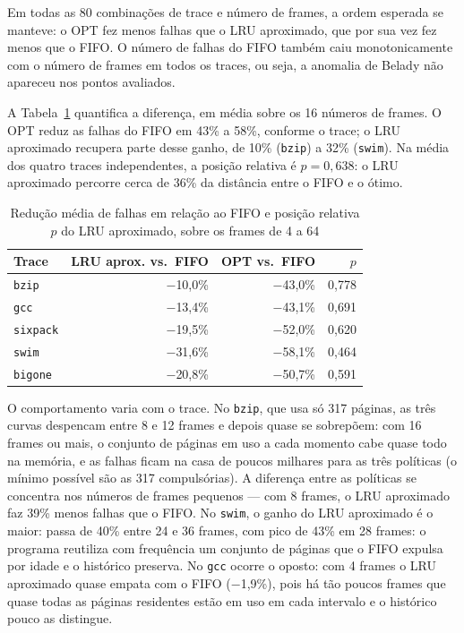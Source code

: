 \documentclass[12pt]{article}
\begin{document}
Em todas as 80 combinações de trace e número de frames, a ordem esperada se
manteve: o OPT fez menos falhas que o LRU aproximado, que por sua vez fez menos
que o FIFO. O número de falhas do FIFO também caiu monotonicamente com o número
de frames em todos os traces, ou seja, a anomalia de Belady não apareceu nos
pontos avaliados.

A Tabela~\ref{tab:resumo} quantifica a diferença, em média sobre os 16 números
de frames. O OPT reduz as falhas do FIFO em 43\% a 58\%, conforme o trace; o
LRU aproximado recupera parte desse ganho, de 10\% (\texttt{bzip}) a 32\%
(\texttt{swim}). Na média dos quatro traces independentes, a posição relativa
é $p = 0{,}638$: o LRU aproximado percorre cerca de 36\% da distância entre o
FIFO e o ótimo.

\begin{table}[ht]
\centering
\caption{Redução média de falhas em relação ao FIFO e posição relativa $p$ do
  LRU aproximado, sobre os frames de 4 a 64}
\label{tab:resumo}
\begin{tabular}{lrrr}
\hline
Trace & LRU aprox. vs.\ FIFO & OPT vs.\ FIFO & $p$ \\
\hline
\texttt{bzip}    & $-$10,0\% & $-$43,0\% & 0,778 \\
\texttt{gcc}     & $-$13,4\% & $-$43,1\% & 0,691 \\
\texttt{sixpack} & $-$19,5\% & $-$52,0\% & 0,620 \\
\texttt{swim}    & $-$31,6\% & $-$58,1\% & 0,464 \\
\texttt{bigone}  & $-$20,8\% & $-$50,7\% & 0,591 \\
\hline
\end{tabular}
\end{table}

O comportamento varia com o trace. No \texttt{bzip}, que usa só 317 páginas, as
três curvas despencam entre 8 e 12 frames e depois quase se sobrepõem: com 16
frames ou mais, o conjunto de páginas em uso a cada momento cabe quase todo na
memória, e as falhas ficam na casa de poucos milhares para as três políticas
(o mínimo possível são as 317 compulsórias). A diferença entre as políticas se concentra nos números de
frames pequenos --- com 8 frames, o LRU aproximado faz 39\% menos falhas que o
FIFO. No \texttt{swim}, o ganho do LRU aproximado é o maior: passa de 40\%
entre 24 e 36 frames, com pico de 43\% em 28 frames: o programa reutiliza com frequência um conjunto de páginas
que o FIFO expulsa por idade e o histórico preserva. No \texttt{gcc} ocorre o
oposto: com 4 frames o LRU aproximado quase empata com o FIFO ($-$1,9\%), pois
há tão poucos frames que quase todas as páginas residentes estão em uso em
cada intervalo e o histórico pouco as distingue.
\end{document}

